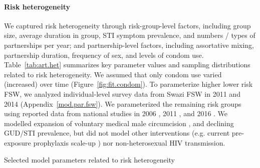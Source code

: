 \paragraph{Risk heterogeneity}
We captured risk heterogeneity through risk-group-level factors, including
group size, average duration in group, STI symptom prevalence, and numbers / types of partnerships per year;
and partnership-level factors, including
assortative mixing, partnership duration, frequency of sex, and levels of condom use.
Table~\ref{tab:art.het} summarizes key parameter values and sampling distributions related to risk heterogeneity.
We assumed that only condom use varied (increased) over time (Figure~\ref{fig:fit.condom}).
To parameterize higher \vs lower risk FSW, we analyzed individual-level survey data
from Swazi FSW in 2011 \cite{Baral2014} and 2014 \cite{EswKP2014} (Appendix~\ref{mod.par.fsw}).
We parameterized the remaining risk groups using reported data from national studies in
2006 \cite{SDHS2006}, 2011 \cite{SHIMS1}, and 2016 \cite{SHIMS2}.
We modelled expansion of voluntary medical male circumcision \cite{SHIMS2},
and declining GUD/STI prevalence,
but did not model other interventions (e.g. current pre-exposure prophylaxis scale-up \cite{EswCOP21})
nor non-heterosexual HIV transmission.
\begin{table}
  \centering
  \caption{Selected model parameters related to risk heterogeneity}
  
  \label{tab:art.het}
\end{table}
